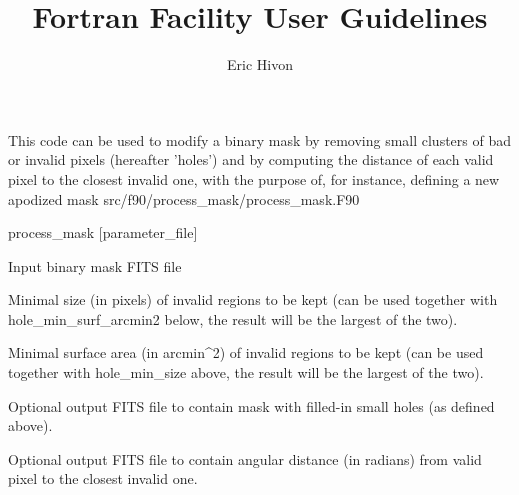 
\sloppy


\title{\healpix Fortran Facility User Guidelines}
 \section[process\_mask]{\nosectionname}
\label{fac:process_mask}
\author{Eric Hivon}

\begin{facility}
{This code can be used to modify a binary mask by removing small clusters of bad
or invalid pixels (hereafter 'holes') and by computing the distance of each
valid pixel to the closest invalid one, with the purpose of, for instance,
defining a new apodized mask} 
{src/f90/process\_mask/process\_mask.F90}
\end{facility}

\begin{f90facility}
{process\_mask [parameter\_file]}
\end{f90facility}


\begin{qualifiers}
  \begin{qulist}{} %
\item[{mask\_file = }] Input binary mask FITS file
\item[{hole\_min\_size = }] Minimal size (in pixels) of invalid regions to be kept
       (can be used together with hole\_min\_surf\_arcmin2 below, the result will
be the largest of the two). 
\item[{hole\_min\_surf\_arcmin2 = }] Minimal surface area (in arcmin\^{}2) of invalid regions to be kept
       (can be used together with hole\_min\_size above,
        the result will be the largest of the two). 
\item[{filled\_file = }] Optional output FITS file to contain mask with
filled-in small holes (as defined above). 
\item[{distance\_file = }] Optional output FITS file to contain angular distance
(in radians) from valid pixel to the closest invalid one. 

  \end{qulist}
\end{qualifiers}

